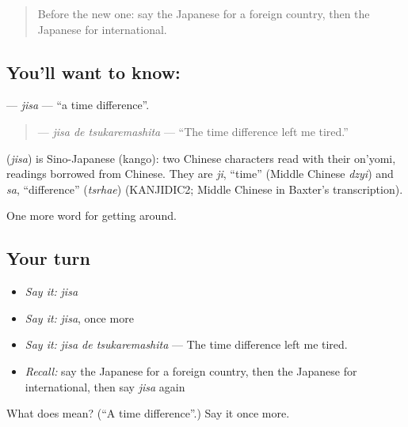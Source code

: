 \begin{quote}
Before the new one: say the Japanese for a foreign country, then the Japanese for international.
\end{quote}

\subsection*{You'll want to know: }
\textbf{} — \emph{jisa} — \textquotedblleft{}a time difference\textquotedblright{}.

\begin{quote}
\textbf{ } — \emph{jisa de tsukaremashita} — \textquotedblleft{}The time difference left me tired.\textquotedblright{}
\end{quote}

\begin{cousinweb}
\textbf{} (\emph{jisa}) is Sino-Japanese (kango): two Chinese characters read with their on'yomi, readings borrowed from Chinese. They are \emph{ji}, \textquotedblleft{}time\textquotedblright{} (Middle Chinese \emph{dzyi}) and \emph{sa}, \textquotedblleft{}difference\textquotedblright{} (\emph{tsrhae}) (KANJIDIC2; Middle Chinese in Baxter's transcription).
\end{cousinweb}

\begin{grammarlens}[title={What you've built}]
One more word for getting around.
\end{grammarlens}

\subsection*{Your turn}
\begin{itemize}
\raggedright
  \item \emph{Say it:} \emph{jisa}
  \item \emph{Say it:} \emph{jisa}, once more
  \item \emph{Say it:} \emph{jisa de tsukaremashita} — The time difference left me tired.
  \item \emph{Recall:} say the Japanese for a foreign country, then the Japanese for international, then say \emph{jisa} again
\end{itemize}

\begin{tcolorbox}[breakable,colback=teal!4,colframe=teal!35!black,title={Before you move on}]
What does  mean? (\textquotedblleft{}A time difference\textquotedblright{}.) Say it once more.
\end{tcolorbox}
